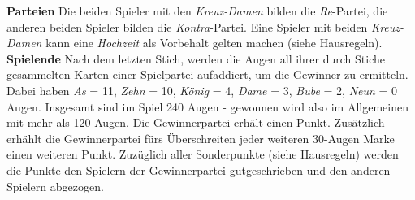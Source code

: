 \documentclass[11pt,a4paper,landscape]{article}
\begin{document}
\begin{multicols}{3}
\textbf{Parteien} Die beiden Spieler mit den \textit{Kreuz-Damen} bilden die \textit{Re}-Partei, die anderen beiden Spieler bilden die \textit{Kontra}-Partei. Eine Spieler mit beiden \textit{Kreuz-Damen} kann eine \textit{Hochzeit} als Vorbehalt gelten machen (siehe Hausregeln). \\

\textbf{Spielende} Nach dem letzten Stich, werden die Augen all ihrer durch Stiche gesammelten Karten einer Spielpartei aufaddiert, um die Gewinner zu ermitteln. Dabei haben \textit{As} = 11, \textit{Zehn} = 10, \textit{König} = 4, \textit{Dame} = 3, \textit{Bube} = 2, \textit{Neun} = 0 Augen. Insgesamt sind im Spiel 240 Augen - gewonnen wird also im Allgemeinen mit mehr als 120 Augen. Die Gewinnerpartei erhält einen Punkt. Zusätzlich erhählt die Gewinnerpartei fürs Überschreiten jeder weiteren 30-Augen Marke einen weiteren Punkt. Zuzüglich aller Sonderpunkte (siehe Hausregeln) werden die Punkte den Spielern der Gewinnerpartei gutgeschrieben und den anderen Spielern abgezogen. \\


\end{multicols}
\end{document}
